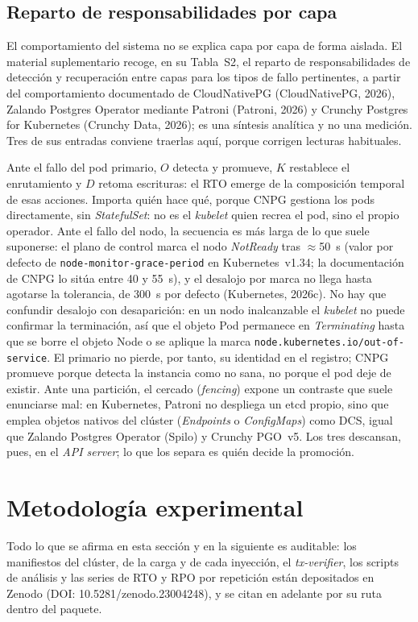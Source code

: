 \documentclass[12pt,twocolumn,letterpaper]{article}
\begin{document}
\subsection{Reparto de responsabilidades por capa}\label{sec:reparto}
El comportamiento del sistema no se explica capa por capa de forma aislada. El material suplementario recoge, en su Tabla~S2, el reparto de responsabilidades de detección y recuperación entre capas para los tipos de fallo pertinentes, a partir del comportamiento documentado de CloudNativePG (CloudNativePG, 2026), Zalando Postgres Operator mediante Patroni (Patroni, 2026) y Crunchy Postgres for Kubernetes (Crunchy Data, 2026); es una síntesis analítica y no una medición. Tres de sus entradas conviene traerlas aquí, porque corrigen lecturas habituales.



Ante el fallo del pod primario, $O$ detecta y promueve, $K$ restablece el enrutamiento y $D$ retoma escrituras: el RTO emerge de la composición temporal de esas acciones. Importa quién hace qué, porque CNPG gestiona los pods directamente, sin \textit{StatefulSet}: no es el \textit{kubelet} quien recrea el pod, sino el propio operador. Ante el fallo del nodo, la secuencia es más larga de lo que suele suponerse: el plano de control marca el nodo \textit{NotReady} tras $\approx$50~s  (valor por defecto de \texttt{node-monitor-grace-period} en Kubernetes~v1.34; la documentación de CNPG lo sitúa entre 40 y 55~s), y el desalojo por marca no llega hasta agotarse la tolerancia, de 300~s por defecto (Kubernetes, 2026c). No hay que confundir desalojo con desaparición: en un nodo inalcanzable el \textit{kubelet} no puede confirmar la terminación, así que el objeto Pod permanece en \textit{Terminating} hasta que se borre el objeto Node o se aplique la marca \texttt{node.kubernetes.io/\allowbreak out-of-\allowbreak service}. El primario no pierde, por tanto, su identidad en el registro; CNPG promueve porque detecta la instancia como no sana, no porque el pod deje de existir. Ante una partición, el cercado (\textit{fencing}) expone un contraste que suele enunciarse mal: en Kubernetes, Patroni no despliega un etcd propio, sino que emplea objetos nativos del clúster  (\textit{Endpoints} o \textit{ConfigMaps}) como DCS, igual que Zalando Postgres Operator (Spilo) y Crunchy PGO~v5. Los tres descansan, pues, en el \textit{API server}; lo que los separa es quién decide la promoción.


\section{Metodología experimental}\label{sec:metodo}
Todo lo que se afirma en esta sección y en la siguiente es auditable: los manifiestos del clúster, de la carga y de cada inyección, el \textit{tx-verifier}, los scripts de análisis y las series de RTO y RPO por repetición están depositados en Zenodo (DOI: 10.5281/\allowbreak zenodo.23004248), y se citan en adelante por su ruta dentro del paquete.
\end{document}
